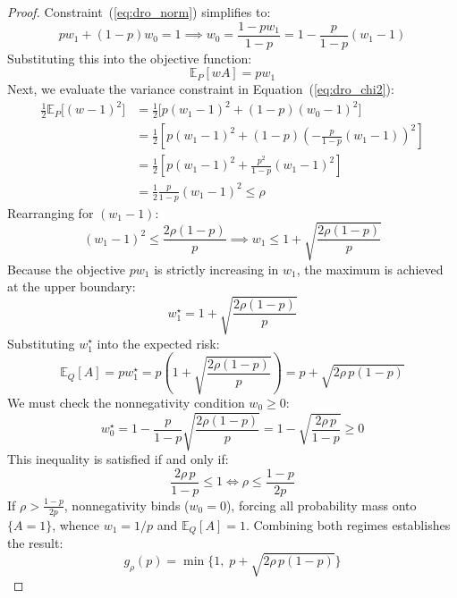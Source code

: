 \begin{proof}
Constraint~(\ref{eq:dro_norm}) simplifies to:
\begin{equation}
    p w_1 + (1 - p) w_0 = 1 \implies w_0 = \frac{1 - p w_1}{1 - p} = 1 - \frac{p}{1 - p}(w_1 - 1)
\end{equation}
Substituting this into the objective function:
\begin{equation}
    \mathbb{E}_P[w A] = p w_1
\end{equation}
Next, we evaluate the variance constraint in Equation~(\ref{eq:dro_chi2}):
\begin{align}
    \frac{1}{2} \mathbb{E}_P\big[(w - 1)^2\big] &= \frac{1}{2} \Big[ p (w_1 - 1)^2 + (1 - p) (w_0 - 1)^2 \Big] \\
    &= \frac{1}{2} \left[ p (w_1 - 1)^2 + (1 - p) \left( -\frac{p}{1 - p}(w_1 - 1) \right)^{\!2} \right] \\
    &= \frac{1}{2} \left[ p (w_1 - 1)^2 + \frac{p^2}{1 - p} (w_1 - 1)^2 \right] \\
    &= \frac{1}{2} \frac{p}{1 - p} (w_1 - 1)^2 \le \rho
\end{align}
Rearranging for $(w_1 - 1)$:
\begin{equation}
    (w_1 - 1)^2 \le \frac{2\rho(1 - p)}{p} \implies w_1 \le 1 + \sqrt{\frac{2\rho(1 - p)}{p}}
\end{equation}
Because the objective $p w_1$ is strictly increasing in $w_1$, the maximum is achieved at the upper boundary:
\begin{equation}
    w_1^\star = 1 + \sqrt{\frac{2\rho(1 - p)}{p}}
\end{equation}
Substituting $w_1^\star$ into the expected risk:
\begin{equation}
    \mathbb{E}_Q[A] = p w_1^\star = p \left( 1 + \sqrt{\frac{2\rho(1 - p)}{p}} \right) = p + \sqrt{2\rho\,p(1 - p)}
\end{equation}
We must check the nonnegativity condition $w_0 \ge 0$:
\begin{equation}
    w_0^\star = 1 - \frac{p}{1 - p}\sqrt{\frac{2\rho(1 - p)}{p}} = 1 - \sqrt{\frac{2\rho\,p}{1 - p}} \ge 0
\end{equation}
This inequality is satisfied if and only if:
\begin{equation}
    \frac{2\rho\,p}{1 - p} \le 1 \iff \rho \le \frac{1 - p}{2p}
\end{equation}
If $\rho > \frac{1-p}{2p}$, nonnegativity binds ($w_0 = 0$), forcing all probability mass onto $\{A = 1\}$, whence $w_1 = 1/p$ and $\mathbb{E}_Q[A] = 1$. Combining both regimes establishes the result:
\begin{equation}
    g_\rho(p) = \min\Big\{1,\; p + \sqrt{2\rho\,p(1 - p)}\Big\}
\end{equation}
\end{proof}


